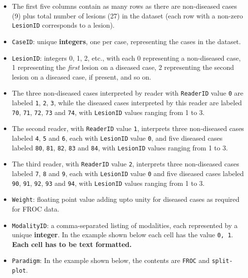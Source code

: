 \documentclass[
]{book}
\providecommand{\tightlist}{%
  \setlength{\itemsep}{0pt}\setlength{\parskip}{0pt}}
\begin{document}
\begin{itemize}
\tightlist
\item
  The first five columns contain as many rows as there are non-diseased cases (9) plus total number of lesions (27) in the dataset (each row with a non-zero \texttt{LesionID} corresponds to a lesion).
\item
  \texttt{CaseID}: unique \textbf{integers}, one per case, representing the cases in the dataset.
\item
  \texttt{LesionID}: integers 0, 1, 2, etc., with each 0 representing a non-diseased case, 1 representing the \emph{first} lesion on a diseased case, 2 representing the second lesion on a diseased case, if present, and so on.
\item
  The three non-diseased cases interpreted by reader with \texttt{ReaderID} value \texttt{0} are labeled \texttt{1}, \texttt{2}, \texttt{3}, while the diseased cases interpreted by this reader are labeled \texttt{70}, \texttt{71}, \texttt{72}, \texttt{73} and \texttt{74}, with \texttt{LesionID} values ranging from 1 to 3.\\
\item
  The second reader, with \texttt{ReaderID} value \texttt{1}, interprets three non-diseased cases labeled \texttt{4}, \texttt{5} and \texttt{6}, each with \texttt{LesionID} value \texttt{0}, and five diseased cases labeled \texttt{80}, \texttt{81}, \texttt{82}, \texttt{83} and \texttt{84}, with \texttt{LesionID} values ranging from 1 to 3.\\
\item
  The third reader, with \texttt{ReaderID} value \texttt{2}, interprets three non-diseased cases labeled \texttt{7}, \texttt{8} and \texttt{9}, each with \texttt{LesionID} value \texttt{0} and five diseased cases labeled \texttt{90}, \texttt{91}, \texttt{92}, \texttt{93} and \texttt{94}, with \texttt{LesionID} values ranging from 1 to 3.\\
\item
  \texttt{Weight}: floating point value adding upto unity for diseased cases as required for FROC data.
\item
  \texttt{ModalityID}: a comma-separated listing of modalities, each represented by a unique \textbf{integer}. In the example shown below each cell has the value \texttt{0,\ 1}. \textbf{Each cell has to be text formatted.}
\item
  \texttt{Paradigm}: In the example shown below, the contents are \texttt{FROC} and \texttt{split-plot}.
\end{itemize}
\end{document}

